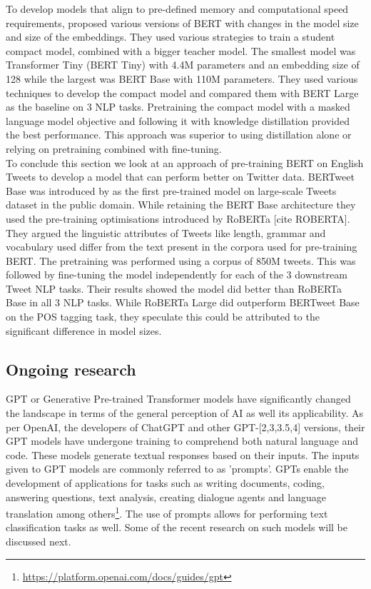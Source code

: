 To develop models that align to pre-defined memory and computational speed requirements, \cite{turcWellReadStudentsLearn2019} proposed various versions of BERT with changes in the model size and size of the embeddings. They used various strategies to train a student compact model, combined with a bigger teacher model. The smallest model was Transformer Tiny (BERT Tiny) with  4.4M parameters and an embedding size of 128 while the largest was BERT Base with 110M parameters. They used various techniques to develop the compact model and compared them with BERT Large as the baseline on 3 NLP tasks. Pretraining the compact model with a masked language model objective and following it with knowledge distillation provided the best performance. This approach was superior to using distillation alone or relying on pretraining combined with fine-tuning.\\

To conclude this section we look at an approach of pre-training BERT on English Tweets to develop a model that can perform better on Twitter data. BERTweet Base was introduced by \cite{nguyenBERTweetPretrainedLanguage2020} as the first pre-trained model on large-scale Tweets dataset in the public domain. While retaining the BERT Base architecture they used the pre-training optimisations introduced by RoBERTa [cite ROBERTA]. They argued the linguistic attributes of Tweets like length, grammar and vocabulary used differ from the text present in the corpora used for pre-training BERT. The pretraining was performed using a corpus of 850M tweets. This was followed by fine-tuning the model independently for each of the 3 downstream Tweet NLP tasks. Their results showed the model did better than RoBERTa Base in all 3 NLP tasks. While RoBERTa Large did outperform BERTweet Base on the POS tagging task, they speculate this could be attributed to the significant difference in model sizes.

\subsection{Ongoing research}
GPT or Generative Pre-trained Transformer models have significantly changed the landscape in terms of the general perception of AI as well its applicability. As per OpenAI, the developers of ChatGPT and other GPT-[2,3,3.5,4] versions, their GPT models have undergone training to comprehend both natural language and code. These models generate textual responses based on their inputs. The inputs given to GPT models are commonly referred to as 'prompts'. GPTs enable the development of applications for tasks such as writing documents, coding, answering questions, text analysis, creating dialogue agents and language translation among others\footnote{\url{https://platform.openai.com/docs/guides/gpt}}. The use of prompts allows for performing text classification tasks as well. Some of the recent research on such models will be discussed next.\\

